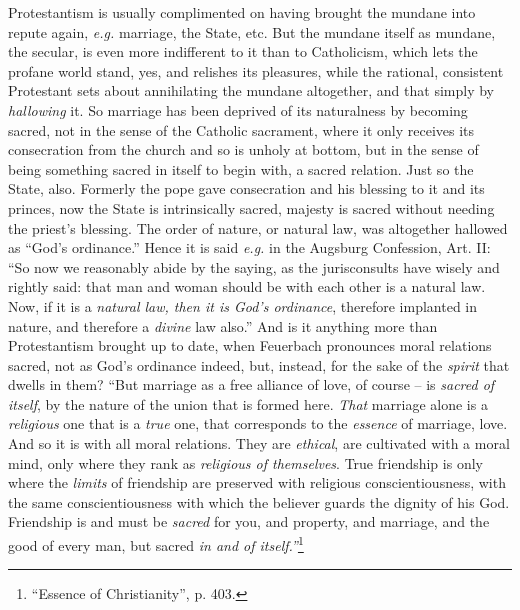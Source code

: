Protestantism is usually complimented on having brought the mundane into 
repute again, \textit{e.g.} marriage, the State, etc. But the mundane itself 
as mundane, the secular, is even more indifferent to it than to Catholicism, 
which lets the profane world stand, yes, and relishes its pleasures, while the 
rational, consistent Protestant sets about annihilating the mundane 
altogether, and that simply by \textit{hallowing} it. So marriage has been 
deprived of its naturalness by becoming sacred, not in the sense of the 
Catholic sacrament, where it only receives its consecration from the church 
and so is unholy at bottom, but in the sense of being something sacred in 
itself to begin with, a sacred relation. Just so the State, also. Formerly the 
pope gave consecration and his blessing to it and its princes, now the State 
is intrinsically sacred, majesty is sacred without needing the priest's 
blessing. The order of nature, or natural law, was altogether hallowed as 
``God's ordinance.'' Hence it is said \textit{e.g.} in the Augsburg 
Confession, Art. II: ``So now we reasonably abide by the saying, as the 
jurisconsults have wisely and rightly said: that man and woman should be with 
each other is a natural law. Now, if it is a \textit{natural law, then it is 
God's ordinance}, therefore implanted in nature, and therefore a 
\textit{divine} law also.'' And is it anything more than Protestantism 
brought up to date, when Feuerbach pronounces moral relations sacred, not as 
God's ordinance indeed, but, instead, for the sake of the \textit{spirit} that 
dwells in them? ``But marriage as a free alliance of love, of course -- is 
\textit{sacred of itself}, by the nature of the union that is formed here. 
\textit{That} marriage alone is a \textit{religious} one that is a 
\textit{true} one, that corresponds to the \textit{essence} of marriage, love. 
And so it is with all moral relations. They are \textit{ethical}, are 
cultivated with a moral mind, only where they rank as \textit{religious of 
themselves}. True friendship is only where the \textit{limits} of friendship 
are preserved with religious conscientiousness, with the same 
conscientiousness with which the believer guards the dignity of his God. 
Friendship is and must be \textit{sacred} for you, and property, and marriage, 
and the good of every man, but sacred \textit{in and of 
itself.''}\footnote{``Essence of Christianity'', p. 403.}

